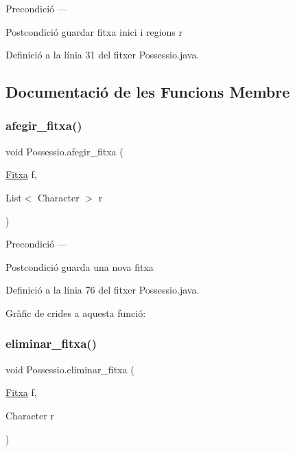 \begin{DoxyPrecond}{Precondició}
--- 
\end{DoxyPrecond}
\begin{DoxyPostcond}{Postcondició}
guardar fitxa inici i regions r 
\end{DoxyPostcond}


Definició a la línia 31 del fitxer Possessio.\+java.



\subsection{Documentació de les Funcions Membre}
\mbox{\label{class_possessio_af662b46bc78afc70a7f874693d518612}} 
\subsubsection{\texorpdfstring{afegir\+\_\+fitxa()}{afegir\_fitxa()}}
{\footnotesize\ttfamily void Possessio.\+afegir\+\_\+fitxa (\begin{DoxyParamCaption}\item[{\mbox{\hyperlink{class_fitxa}{Fitxa}}}]{f,  }\item[{List$<$ Character $>$}]{r }\end{DoxyParamCaption})}

\begin{DoxyPrecond}{Precondició}
--- 
\end{DoxyPrecond}
\begin{DoxyPostcond}{Postcondició}
guarda una nova fitxa 
\end{DoxyPostcond}


Definició a la línia 76 del fitxer Possessio.\+java.

Gràfic de crides a aquesta funció\+:
\mbox{\label{class_possessio_a2d34d7e8539eeface62f627f568ee37d}} 
\subsubsection{\texorpdfstring{eliminar\+\_\+fitxa()}{eliminar\_fitxa()}\hspace{0.1cm}{\footnotesize\ttfamily [1/2]}}
{\footnotesize\ttfamily void Possessio.\+eliminar\+\_\+fitxa (\begin{DoxyParamCaption}\item[{\mbox{\hyperlink{class_fitxa}{Fitxa}}}]{f,  }\item[{Character}]{r }\end{DoxyParamCaption})}


